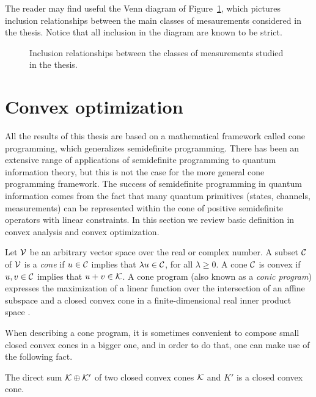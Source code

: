 The reader may find useful the Venn diagram of Figure~\ref{fig:classes-measurements}, 
which pictures inclusion relationships between the main classes of mesaurements
considered in the thesis. Notice that all inclusion in the diagram are known
to be strict.

\begin{figure}[!ht]
  \centering
    \def\svgwidth{200pt}
    \scalebox{.75}{}
    \caption{Inclusion relationships between the classes of measurements studied 
      in the thesis.}
    \label{fig:classes-measurements}
\end{figure}

\section{Convex optimization}
\label{sec:convex-optimization}

All the results of this thesis are based on a mathematical framework 
called cone programming, which generalizes semidefinite programming.
There has been an extensive range of applications of semidefinite programming
to quantum information theory, but this is not the case for  
the more general cone programming framework. 
The success of semidefinite programming in quantum information comes from the fact 
that many quantum primitives (states, channels, measurements) 
can be represented within the cone of positive semidefinite operators with linear
constraints. 
In this section we review basic definition in convex analysis and convex optimization.

Let $\mathcal{V}$ be an arbitrary vector space over the real or complex number.
A subset $\mathcal{C}$ of $\mathcal{V}$ is a \emph{cone} if $u\in\mathcal{C}$ implies that $\lambda u \in \mathcal{C}$,
for all $\lambda \geq 0$. A cone $\mathcal{C}$ is convex if $u,v\in\mathcal{C}$ implies that
$u + v \in \mathcal{K}$.
A cone program (also known as a \emph{conic program}) expresses the
maximization of a linear function over the intersection of an affine subspace
and a closed convex cone in a finite-dimensional real inner product
space \cite{Boyd04}. 

When describing a cone program, it is sometimes convenient to compose small closed convex 
cones in a bigger one, and in order to do that, one can make use of the following fact. 
\begin{fact}
\label{fact:direct-sum-closed}
The direct sum $\mathcal{K} \oplus \mathcal{K}'$ of two closed convex cones $\mathcal{K}$ and $K'$ is a 
closed convex cone. 
\end{fact}

